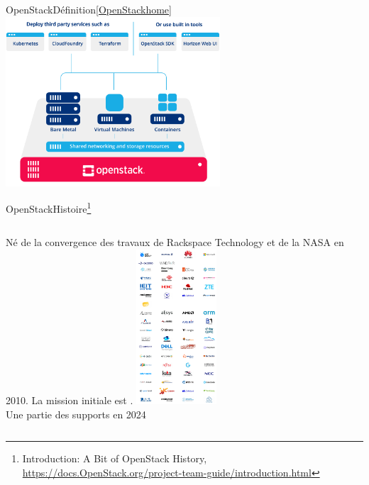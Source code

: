 \documentclass{beamer}
\begin{document}
    \begin{frame}{OpenStack}{Définition\cref{OpenStackhome}}
        \bigbreak
        \centering
        \includegraphics[width=8cm]{image/openstack-overview}
    \end{frame}

    \begin{frame}{OpenStack}{Histoire\footnote{Introduction: A Bit of OpenStack History, \url{https://docs.OpenStack.org/project-team-guide/introduction.html}}}

        \begin{columns}
            Né de la convergence des travaux de Rackspace Technology et de la NASA en 2010.
            \bigbreak
            La mission initiale est .
            \centering
            \includegraphics[width=3cm]{image/openstack-supports} \\ \tiny{Une partie des supports en 2024}\\
        \end{columns}
    \end{frame}
\end{document}
